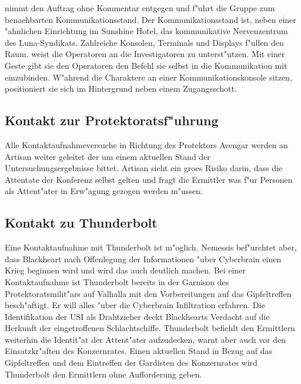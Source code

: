 
\xl{} nimmt den Auftrag ohne Kommentar entgegen und f"uhrt die Gruppe zum benachbarten Kommunikationsstand. Der Kommunikationsstand ist, neben einer "ahnlichen Einrichtung im Sunshine Hotel, das kommunikative Nervenzentrum des Luna-Syndikats. Zahlreiche Konsolen, Terminals und Displays f"ullen den Raum. \xl{} weist die Operatoren an die Investigatoren zu unterst"utzen. Mit einer Geste gibt sie den Operatoren den Befehl sie selbst in die Kommunikation mit einzubinden. W"ahrend die Charaktere an einer Kommunikationskonsole sitzen, positioniert sie sich im Hintergrund neben einem Zugangsschott.

\subsection{Kontakt zur Protektoratsf"uhrung} 
Alle Kontaktaufnahmeversuche in Richtung des Protektors Avengar werden an Artisan weiter geleitet der um einem aktuellen Stand der Untersuchungsergebnisse bittet. Artisan sieht ein gro\3es Risiko darin, dass die Attentate der Konferenz selbst gelten und fragt die Ermittler was f"ur Personen als Attent"ater in Erw"agung gezogen werden m"ussen.

\subsection{Kontakt zu Thunderbolt} 
Eine Kontaktaufnahme mit Thunderbolt ist m"oglich. Nemessis bef"urchtet aber, dass Blackheart nach Offenlegung der Informationen "uber Cyberbrain einen Krieg beginnen wird und wird das auch deutlich machen. Bei einer Kontaktaufnahme ist Thunderbolt bereits in der Garnison des Protektoratsmilit"ars auf Valhalla mit den Vorbereitungen auf das Gipfeltreffen besch"aftigt. Er will alles "uber die Cyberbrain Infiltration erfahren. Die Identifikation der USI als Drahtzieher deckt Blackhearts Verdacht auf die Herkunft der eingetroffenen Schlachtschiffe. Thunderbolt befiehlt den Ermittlern weiterhin die Identit"at der Attent"ater aufzudecken, warnt aber auch vor den Einsatzkr"aften des Konzernrates. Einen aktuellen Stand in Bezug auf das Gipfeltreffen und dem Eintreffen der Gardisten des Konzernrates wird Thunderbolt den Ermittlern ohne Aufforderung geben.

